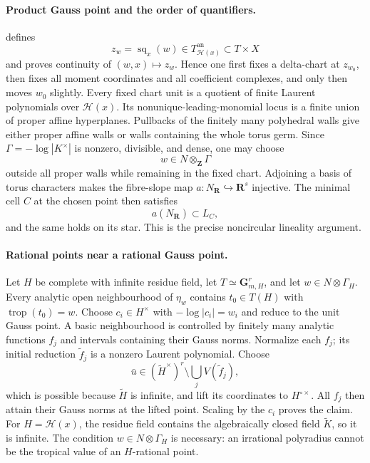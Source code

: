 \paragraph{Product Gauss point and the order of quantifiers.}
\cite[\S\S12.1.9--12.1.11]{CLD25} defines
\[
 z_w=\operatorname{sq}_x(w)\in T_{\mathscr H(x)}^{\mathrm{an}}
        \subset T\times X
\]
and proves continuity of \((w,x)\mapsto z_w\).
Hence one first fixes a delta-chart at \(z_{w_0}\), then fixes all moment
coordinates and all coefficient complexes, and only then moves \(w_0\)
slightly.  Every fixed chart unit is a quotient of finite Laurent
polynomials over \(\mathscr H(x)\).  Its nonunique-leading-monomial locus is
a finite union of proper affine hyperplanes.  Pullbacks of the finitely many
polyhedral walls give either proper affine walls or walls containing the
whole torus germ.  Since
\(\Gamma=-\log|K^\times|\) is nonzero, divisible, and dense, one may choose
\[
                 w\in N\otimes_{\mathbf Z}\Gamma
\]
outside all proper walls while remaining in the fixed chart.  Adjoining a
basis of torus characters makes the fibre-slope map
\(a:N_{\mathbf R}\hookrightarrow\mathbf R^s\) injective.  The minimal cell
\(C\) at the chosen point then satisfies
\[
                 a(N_{\mathbf R})\subset L_C,
\]
and the same holds on its star.  This is the precise noncircular
lineality argument.

\paragraph{Rational points near a rational Gauss point.}
Let \(H\) be complete with infinite residue field, let
\(T\simeq\mathbf G_{m,H}^r\), and let
\(w\in N\otimes\Gamma_H\).  Every analytic open neighbourhood of
\(\eta_w\) contains \(t_0\in T(H)\) with
\(\operatorname{trop}(t_0)=w\).
Choose \(c_i\in H^\times\) with \(-\log|c_i|=w_i\) and reduce to the unit
Gauss point.  A basic neighbourhood is controlled by finitely many analytic
functions \(f_j\) and intervals containing their Gauss norms.  Normalize
each \(f_j\); its initial reduction \(\widetilde f_j\) is a nonzero Laurent
polynomial.  Choose
\[
 \bar u\in(\widetilde H^\times)^r
       \setminus\bigcup_jV(\widetilde f_j),
\]
which is possible because \(\widetilde H\) is infinite, and lift its
coordinates to \(H^{\circ\times}\).  All \(f_j\) then attain their Gauss
norms at the lifted point.  Scaling by the \(c_i\) proves the claim.
For \(H=\mathscr H(x)\), the residue field contains the algebraically closed
field \(\widetilde K\), so it is infinite.  The condition
\(w\in N\otimes\Gamma_H\) is necessary: an irrational polyradius cannot be
the tropical value of an \(H\)-rational point.

